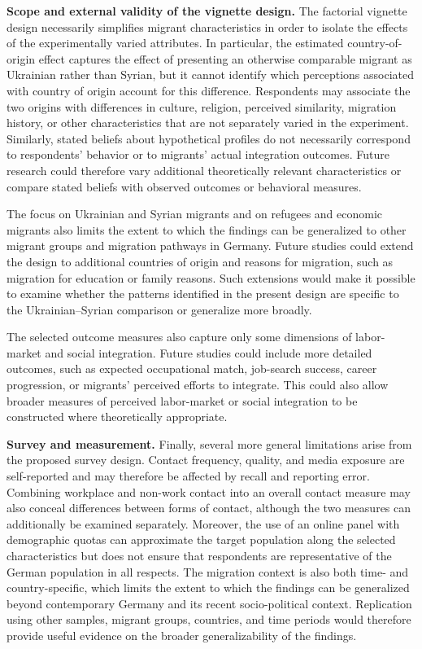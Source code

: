 \noindent\textbf{Scope and external validity of the vignette design.} The factorial vignette design necessarily simplifies migrant characteristics in order to isolate the effects of the experimentally varied attributes. In particular, the estimated country-of-origin effect captures the effect of presenting an otherwise comparable migrant as Ukrainian rather than Syrian, but it cannot identify which perceptions associated with country of origin account for this difference. Respondents may associate the two origins with differences in culture, religion, perceived similarity, migration history, or other characteristics that are not separately varied in the experiment. Similarly, stated beliefs about hypothetical profiles do not necessarily correspond to respondents' behavior or to migrants' actual integration outcomes. Future research could therefore vary additional theoretically relevant characteristics or compare stated beliefs with observed outcomes or behavioral measures.

The focus on Ukrainian and Syrian migrants and on refugees and economic migrants also limits the extent to which the findings can be generalized to other migrant groups and migration pathways in Germany. Future studies could extend the design to additional countries of origin and reasons for migration, such as migration for education or family reasons. Such extensions would make it possible to examine whether the patterns identified in the present design are specific to the Ukrainian--Syrian comparison or generalize more broadly.

The selected outcome measures also capture only some dimensions of labor-market and social integration. Future studies could include more detailed outcomes, such as expected occupational match, job-search success, career progression, or migrants' perceived efforts to integrate. This could also allow broader measures of perceived labor-market or social integration to be constructed where theoretically appropriate.\bigskip

\noindent\textbf{Survey and measurement.} Finally, several more general limitations arise from the proposed survey design. Contact frequency, quality, and media exposure are self-reported and may therefore be affected by recall and reporting error. Combining workplace and non-work contact into an overall contact measure may also conceal differences between forms of contact, although the two measures can additionally be examined separately. Moreover, the use of an online panel with demographic quotas can approximate the target population along the selected characteristics but does not ensure that respondents are representative of the German population in all respects. The migration context is also both time- and country-specific, which limits the extent to which the findings can be generalized beyond contemporary Germany and its recent socio-political context. Replication using other samples, migrant groups, countries, and time periods would therefore provide useful evidence on the broader generalizability of the findings.

